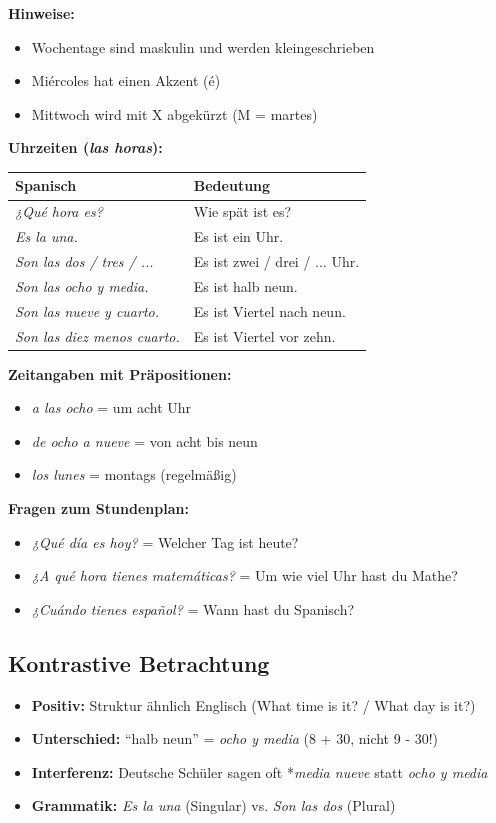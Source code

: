 \documentclass[11pt,a4paper]{article}
\begin{document}
\textbf{Hinweise:}
\begin{itemize}
    \item Wochentage sind maskulin und werden kleingeschrieben
    \item Miércoles hat einen Akzent (é)
    \item Mittwoch wird mit X abgekürzt (M = martes)
\end{itemize}

\textbf{Uhrzeiten (\textit{las horas}):}
\begin{center}
\begin{tabular}{|l|l|}
\hline
\textbf{Spanisch} & \textbf{Bedeutung} \\
\hline
\textit{¿Qué hora es?} & Wie spät ist es? \\
\textit{Es la una.} & Es ist ein Uhr. \\
\textit{Son las dos / tres / ...} & Es ist zwei / drei / ... Uhr. \\
\textit{Son las ocho y media.} & Es ist halb neun. \\
\textit{Son las nueve y cuarto.} & Es ist Viertel nach neun. \\
\textit{Son las diez menos cuarto.} & Es ist Viertel vor zehn. \\
\hline
\end{tabular}
\end{center}

\textbf{Zeitangaben mit Präpositionen:}
\begin{itemize}
    \item \textit{a las ocho} = um acht Uhr
    \item \textit{de ocho a nueve} = von acht bis neun
    \item \textit{los lunes} = montags (regelmäßig)
\end{itemize}

\textbf{Fragen zum Stundenplan:}
\begin{itemize}
    \item \textit{¿Qué día es hoy?} = Welcher Tag ist heute?
    \item \textit{¿A qué hora tienes matemáticas?} = Um wie viel Uhr hast du Mathe?
    \item \textit{¿Cuándo tienes español?} = Wann hast du Spanisch?
\end{itemize}

\subsection{Kontrastive Betrachtung}
\begin{itemize}
    \item \textbf{Positiv:} Struktur ähnlich Englisch (What time is it? / What day is it?)
    \item \textbf{Unterschied:} ``halb neun'' = \textit{ocho y media} (8 + 30, nicht 9 - 30!)
    \item \textbf{Interferenz:} Deutsche Schüler sagen oft *\textit{media nueve} statt \textit{ocho y media}
    \item \textbf{Grammatik:} \textit{Es la una} (Singular) vs. \textit{Son las dos} (Plural)
\end{itemize}
\end{document}
